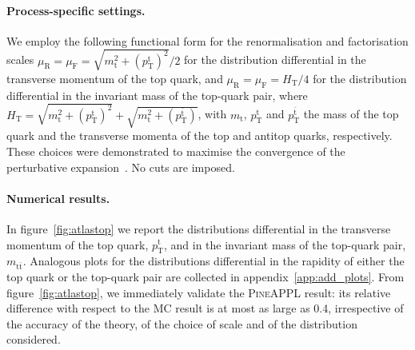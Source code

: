 \paragraph{Process-specific settings.}
We employ the following functional form for the renormalisation and factorisation scales
$\mu_\mathrm{R}=\mu_\mathrm{F}=\sqrt{m_\mathrm{t}^2+(p_\mathrm{T}^\mathrm{t})^2}{\Big /}2$ for the distribution differential
in the transverse momentum of the top quark, and $\mu_\mathrm{R}=\mu_\mathrm{F}=H_\mathrm{T}/4$ for the
distribution differential in the invariant mass of the top-quark pair, where
$H_\mathrm{T}=\sqrt{m_\mathrm{t}^2+(p_\mathrm{T}^\mathrm{t})^2}+\sqrt{m_\mathrm{t}^2+(p_\mathrm{T}^{\bar{\mathrm{t}}})}$, with $m_\mathrm{t}$,
$p_\mathrm{T}^\mathrm{t}$ and $p_\mathrm{T}^{\bar{\mathrm{t}}}$ the mass of the top quark and the transverse momenta
of the top and antitop quarks, respectively. These choices were demonstrated
to maximise the convergence of the perturbative expansion~\cite{Czakon:2016dgf}. No cuts are imposed.

\paragraph{Numerical results.}

In figure~\ref{fig:atlastop} we report the
distributions differential in the transverse momentum of the top quark,
$p_\mathrm{T}^\mathrm{t}$, and in the invariant mass of the top-quark pair,
$m_{\mathrm{t}\bar{\mathrm{t}}}$. Analogous plots for the distributions differential
in the rapidity of either the top quark or the top-quark pair are collected in
appendix~\ref{app:add_plots}. From figure~\ref{fig:atlastop}, we immediately
validate the \textsc{PineAPPL} result: its relative difference with respect to
the MC result is at most as large as \SI{0.4}{\permille}, irrespective of the
accuracy of the theory, of the choice of scale and of the distribution
considered.

